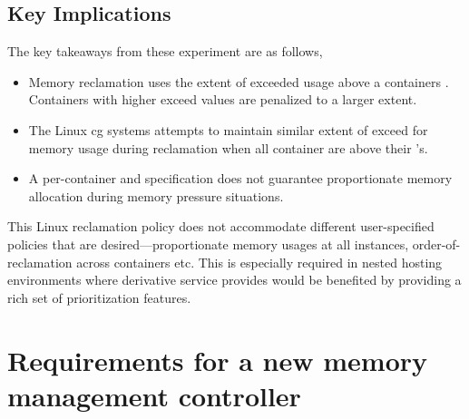     \subsection{Key Implications}
    The key takeaways from these experiment are as follows,
      \begin{itemize}
      \item Memory reclamation uses the extent of exceeded usage above a containers \sol{}.
      Containers with higher exceed values are penalized to a larger extent.
      \item The Linux cg{} systems attempts to maintain similar extent of exceed for
      memory usage during reclamation when all container are above their \sol's.
      \item A per-container \sol{} and \hl{} specification does not guarantee proportionate
      memory allocation during memory pressure situations.
      \end{itemize}
      This Linux \cg{} reclamation policy does not accommodate different user-specified policies
      that are desired---proportionate memory usages at all instances,
      order-of-reclamation across containers etc. This is especially required in nested
      hosting environments where derivative service provides would be benefited
      by providing a rich set of prioritization features.
    
  \section{Requirements for a new memory management controller}
  
